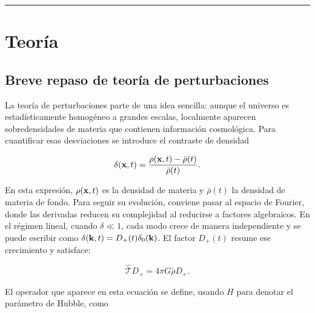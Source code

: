 \documentclass[letterpaper, 12pt]{article}
\begin{document}
    \tableofcontents	%
    
    \vspace{1em}
    
    \noindent\rule{\textwidth}{1pt}
    
    \vspace*{1.5em}
    

    \section{Teoría}
        \subsection{Breve repaso de teoría de perturbaciones}
            La teoría de perturbaciones parte de una idea sencilla: aunque el universo es estadísticamente homogéneo a grandes escalas, localmente aparecen sobredensidades de materia que contienen información cosmológica. Para cuantificar esas desviaciones se introduce el contraste de densidad
            
            \begin{equation}
                \delta(\vb{x},t) = \frac{\rho(\vb{x},t) - \bar{\rho}(t)}{\bar{\rho}(t)}.
            \end{equation} 
            
            En esta expresión, $\rho(\vb{x},t)$ es la densidad de materia y $\bar{\rho}(t)$ la densidad de materia de fondo. Para seguir su evolución, conviene pasar al espacio de Fourier, donde las derivadas reducen su complejidad al reducirse a factores algebraicos. En el régimen lineal, cuando $\delta \ll 1$, cada modo crece de manera independiente y se puede escribir como $\delta(\vb{k},t) = D_+(t)\delta_0(\vb{k})$. El factor $D_+(t)$ resume ese crecimiento y satisface:
            
            \begin{equation}\label{eq:factor_de_crecimiento}
                \hat{\mathcal{T}}D_+ = 4\pi G\bar{\rho}D_+.
            \end{equation}
            
            El operador que aparece en esta ecuación se define, usando $H$ para denotar el parámetro de Hubble, como
            
\end{document}
